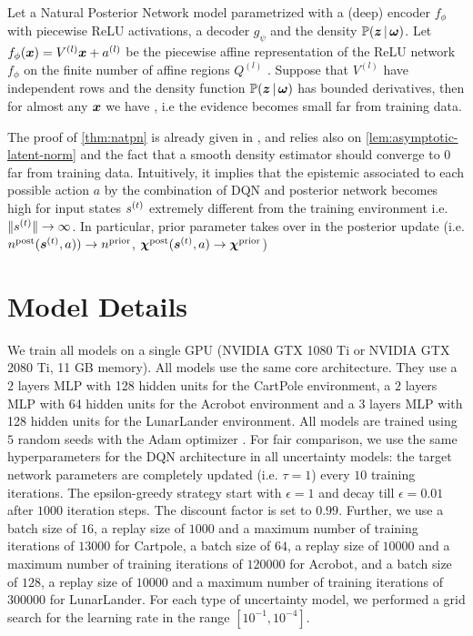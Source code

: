 \begin{theorem}
\label{thm:natpn}
\citep{natpn} Let a Natural Posterior Network model parametrized with a (deep) encoder $f_{\phi}$ with piecewise ReLU activations, a decoder $g_{\psi}$ and the density $\mathbb{P}(\bm{z} \,|\, \bm{\omega})$. Let $f_{\phi}(\bm{x})= V^{(l)}\bm{x} + a^{(l)}$ be the piecewise affine representation of the ReLU network $f_{\phi}$ on the finite number of affine regions $Q^{(l)}$ \citep{understanding-nn-relu}. Suppose that $V^{(l)}$ have independent rows and the density function $\mathbb{P}(\bm{z} \,|\, \bm{\omega})$ has bounded derivatives, then for almost any $\bm{x}$ we have , i.e the evidence becomes small far from training data.
\end{theorem}

The proof of \cref{thm:natpn} is already given in \citep{natpn}, and relies also on \cref{lem:asymptotic-latent-norm} and the fact that a smooth density estimator should converge to $0$ far from training data. Intuitively, it implies that the epistemic associated to each possible action $a$ by the combination of DQN and posterior network becomes high for input states $s^{(t)}$ extremely different from the training environment i.e. $\|s^{(t)}\| \rightarrow \infty$. In particular, prior parameter takes over in the posterior update (i.e. $n^\text{post}(\bm{s}^{(t)}, a)) \rightarrow n^\text{prior}$, $\bm{\chi}^\text{post}(\bm{s}^{(t)}, a) \rightarrow \bm{\chi}^\text{prior}$)

\section{Model Details}
\label{app:models-details}

We train all models on a single GPU (NVIDIA GTX 1080 Ti or NVIDIA GTX 2080 Ti, 11 GB memory). All models use the same core architecture. They use a $2$ layers MLP with 128 hidden units for the CartPole environment, a $2$ layers MLP with 64 hidden units for the Acrobot environment and a $3$ layers MLP with 128 hidden units for the LunarLander environment. All models are trained using $5$ random seeds with the Adam optimizer \citep{Adam}. For fair comparison, we use the same hyperparameters for the DQN architecture in all uncertainty models: the target network parameters are completely updated (i.e. $\tau=1$) every $10$ training iterations. The epsilon-greedy strategy start with $\epsilon=1$ and decay till $\epsilon=0.01$ after $1000$ iteration steps. The discount factor is set to $0.99$. Further, we use a batch size of $16$, a replay size of $1000$ and a maximum number of training iterations of $13000$ for Cartpole, a batch size of $64$, a replay size of $10000$ and a maximum number of training iterations of $120000$ for Acrobot, and a batch size of $128$, a replay size of $10000$ and a maximum number of training iterations of $300000$ for LunarLander. For each type of uncertainty model, we performed a grid search for the learning rate in the range $[10^{-1}, 10^{-4}]$. 

